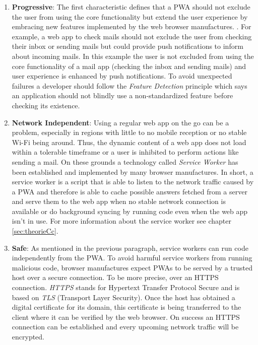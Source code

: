 \begin{enumerate} 
	\item  \textbf{Progressive}: The first characteristic defines that a PWA should not exclude the user from using the core functionality but extend the user experience by embracing new features implemented by the web browser manufactures. \cite[p. 100]{liebelProgressiveWebApps2019}\cite[p. 2]{hajianProgressiveWebApps2019}. For example, a web app to check mails should not exclude the user from checking their inbox or sending mails but could provide push notifications to inform about incoming mails. In this example the user is not excluded from using the core functionality of a mail app (checking the inbox and sending mails) and user experience is enhanced by push notifications. To avoid unexpected failures a developer should follow the \textit{Feature Detection} principle which says an application should not blindly use a non-standardized feature before checking its existence. \cite[p. 101]{liebelProgressiveWebApps2019}

	\item \textbf{Network Independent}: Using a regular web app on the go can be a problem, especially in regions with little to no mobile reception or no stable Wi-Fi being around. Thus, the dynamic content of a web app does not load within a tolerable timeframe or a user is inhibited to perform actions like sending a mail. \cite[p. 106]{liebelProgressiveWebApps2019} On these grounds a technology called \textit{Service Worker} has been established and implemented by many browser manufactures. In short, a service worker is a script that is able to listen to the network traffic caused by a PWA and therefore is able to cache possible answers fetched from a server and serve them to the web app when no stable network connection is available or do background syncing by running code even when the web app isn’t in use. For more information about the service worker see chapter \ref{sec:theorieCc}. \cite[p. 43]{sheppardBeginningProgressiveWeb2017}

	\item \textbf{Safe}: As mentioned in the previous paragraph, service workers can run code independently from the PWA. To avoid harmful service workers from running malicious code, browser manufactures expect PWAs to be served by a trusted host over a secure connection. To be more precise, over an HTTPS connection. \cite[p. 24]{sheppardBeginningProgressiveWeb2017} \textit{HTTPS} stands for Hypertext Transfer Protocol Secure and is based on \textit{TLS} (Transport Layer Security). Once the host has obtained a digital certificate for its domain, this certificate is being transferred to the client where it can be verified by the web browser. On success an HTTPS connection can be established and every upcoming network traffic will be encrypted. \cite[pp. 112-113]{liebelProgressiveWebApps2019}


\end{enumerate}
